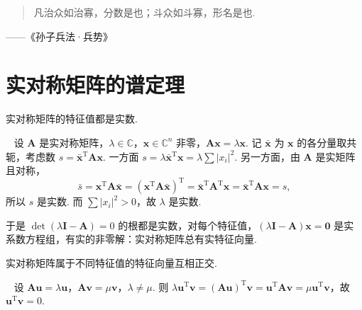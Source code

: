 \documentclass[lang=cn,10.5pt,scheme=chinese,toc=twocol,section,chinesefont=nofont,
twoside,citestyle=gb7714-2015,bibstyle=gb7714-2015]{elegantbook}
\DeclareRobustCommand{\textbf}[1]{{\lnsemiboldlatin\lnsemiboldcjk #1}}
\newcommand{\vv}[1]{\boldsymbol{#1}}
\newcommand{\zero}{\boldsymbol{0}}          %
\newcommand{\trans}{\mathrm{T}}             %
\numberwithin{equation}{section}   %
\newcommand*{\lnlabel}[1]{{\sffamily\bfseries\color{black}#1}}
\renewenvironment{proof}{%
	\par\noindent\lnlabel{\proofname}\;\ \color{black!90}\cfs}{\par}
\begin{document}
\newpage
\begin{tcolorbox}[epigraph]
  \begin{quote}
    凡治众如治寡，分数是也；斗众如斗寡，形名是也.
  \end{quote}
  \begin{flushright}
    ——《孙子兵法·兵势》\footnotemark
  \end{flushright}
\end{tcolorbox}
\section{实对称矩阵的谱定理}

\begin{lemma}
  \label{lem:symreal}
  实对称矩阵的特征值都是实数.
\end{lemma}
\begin{proof}
  设 $\vv A$ 是实对称矩阵，$\lambda\in\mathbb{C}$，$\vv x\in\mathbb{C}^n$ 非零，$\vv{Ax}=\lambda\vv x$. 记 $\bar{\vv x}$ 为 $\vv x$ 的各分量取共轭，考虑数 $s=\bar{\vv x}^\trans\vv A\vv x$. 一方面 $s=\lambda\bar{\vv x}^\trans\vv x=\lambda\sum|x_i|^2$. 另一方面，由 $\vv A$ 是实矩阵且对称，
  \[\bar s=\vv x^\trans\vv A\bar{\vv x}=(\vv x^\trans\vv A\bar{\vv x})^\trans=\bar{\vv x}^\trans\vv A^\trans\vv x=\bar{\vv x}^\trans\vv A\vv x=s,\]
  所以 $s$ 是实数. 而 $\sum|x_i|^2>0$，故 $\lambda$ 是实数.
\end{proof}

于是 $\det(\lambda\vv I-\vv A)=0$ 的根都是实数，对每个特征值，$(\lambda\vv I-\vv A)\vv x=\zero$ 是实系数方程组，有\textbf{实}的非零解：实对称矩阵总有实特征向量.

\begin{lemma}
  实对称矩阵属于不同特征值的特征向量互相正交.
\end{lemma}
\begin{proof}
  设 $\vv{Au}=\lambda\vv u$，$\vv{Av}=\mu\vv v$，$\lambda\ne\mu$. 则 $\lambda\vv u^\trans\vv v=(\vv{Au})^\trans\vv v=\vv u^\trans\vv A\vv v=\mu\vv u^\trans\vv v$，故 $\vv u^\trans\vv v=0$.
\end{proof}
\end{document}
